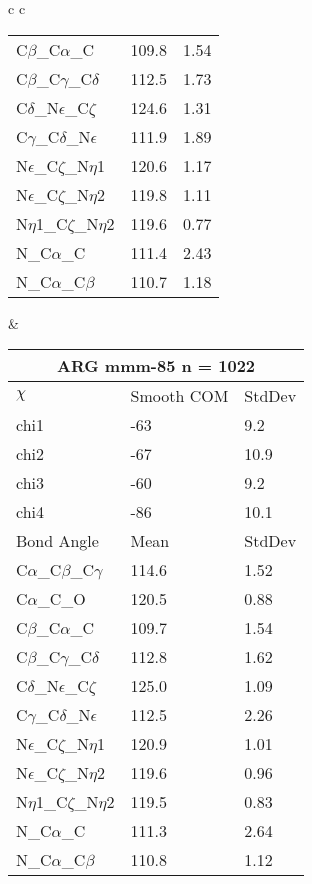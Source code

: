 \begin{longtable}{ c c }
\begin{tabular}{ l l l }
  C$\beta$\_C$\alpha$\_C & 109.8 & 1.54\\
  C$\beta$\_C$\gamma$\_C$\delta$ & 112.5 & 1.73\\
  C$\delta$\_N$\epsilon$\_C$\zeta$ & 124.6 & 1.31\\
  C$\gamma$\_C$\delta$\_N$\epsilon$ & 111.9 & 1.89\\
  N$\epsilon$\_C$\zeta$\_N$\eta$1 & 120.6 & 1.17\\
  N$\epsilon$\_C$\zeta$\_N$\eta$2 & 119.8 & 1.11\\
  N$\eta$1\_C$\zeta$\_N$\eta$2 & 119.6 & 0.77\\
  N\_C$\alpha$\_C & 111.4 & 2.43\\
  N\_C$\alpha$\_C$\beta$ & 110.7 & 1.18\\
  \bottomrule
  \end{tabular}
  &
  \begin{tabular}{ l l l }
  \toprule
  \multicolumn{3}{c}{ARG \textbf{mmm-85} n = 1022} \\ \toprule
  $\chi$       & Smooth COM & StdDev \\ \midrule
  chi1 & -63 & 9.2 \\ 
  chi2 & -67 & 10.9 \\ 
  chi3 & -60 & 9.2 \\ 
  chi4 & -86 & 10.1 \\ \midrule
  Bond Angle   & Mean     & StdDev \\ \midrule
  C$\alpha$\_C$\beta$\_C$\gamma$ & 114.6 & 1.52\\
  C$\alpha$\_C\_O & 120.5 & 0.88\\
  C$\beta$\_C$\alpha$\_C & 109.7 & 1.54\\
  C$\beta$\_C$\gamma$\_C$\delta$ & 112.8 & 1.62\\
  C$\delta$\_N$\epsilon$\_C$\zeta$ & 125.0 & 1.09\\
  C$\gamma$\_C$\delta$\_N$\epsilon$ & 112.5 & 2.26\\
  N$\epsilon$\_C$\zeta$\_N$\eta$1 & 120.9 & 1.01\\
  N$\epsilon$\_C$\zeta$\_N$\eta$2 & 119.6 & 0.96\\
  N$\eta$1\_C$\zeta$\_N$\eta$2 & 119.5 & 0.83\\
  N\_C$\alpha$\_C & 111.3 & 2.64\\
  N\_C$\alpha$\_C$\beta$ & 110.8 & 1.12\\
  \bottomrule
  \end{tabular}
  \\
  
\end{longtable}


